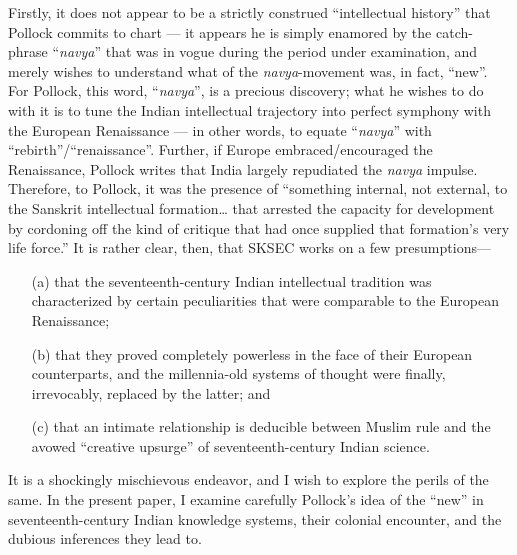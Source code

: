 Firstly, it does not appear to be a strictly construed “intellectual history” that Pollock commits to chart — it appears he is simply enamored by the catch-phrase “{\sl navya}” that was in vogue during the period under examination, and merely wishes to understand what of the {\sl navya}-movement was, in fact, “new”. For Pollock, this word, “{\sl navya}”, is a precious discovery; what he wishes to do with it is to tune the Indian intellectual trajectory into perfect symphony with the European Renaissance — in other words, to equate “{\sl navya}” with “rebirth”/“renaissance”. Further, if Europe embraced/encouraged the Renaissance, Pollock writes that India largely repudiated the {\sl navya} impulse. Therefore, to Pollock, it was the presence of “something internal, not external, to the Sanskrit intellectual formation… that arrested the capacity for development by cordoning off the kind of critique that had once supplied that formation’s very life force.”
It is rather clear, then, that SKSEC works on a few presumptions—   
\begin{itemize}
\itemsep=0pt
\item[(a)] that the seventeenth-century Indian intellectual tradition was characterized by certain peculiarities that were comparable to the European Renaissance;

\item[(b)] that they proved completely powerless in the face of their European counterparts, and the millennia-old systems of thought were finally, irrevocably, replaced by the latter; and 

\item[(c)] that an intimate relationship is deducible between Muslim rule and the avowed “creative upsurge” of seventeenth-century Indian science.
\end{itemize}

It is a shockingly mischievous endeavor, and I wish to explore the perils of the same.  In the present paper, I examine carefully Pollock’s idea of the “new” in seventeenth-century Indian knowledge systems, their colonial encounter, and the dubious inferences they lead to.\\[-20pt]

